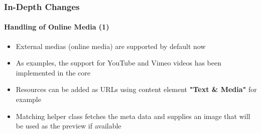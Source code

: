 \begin{frame}[fragile]
	\frametitle{In-Depth Changes}
	\framesubtitle{Handling of Online Media (1)}

	\begin{itemize}

		\item External medias (online media) are supported by default now

		\item As examples, the support for YouTube and Vimeo videos has been implemented in the core

		\item Resources can be added as URLs using content element \textbf{"Text \& Media"}
			for example

		\item Matching helper class fetches the meta data and supplies an image that will be
			used as the preview if available

	\end{itemize}

\end{frame}


